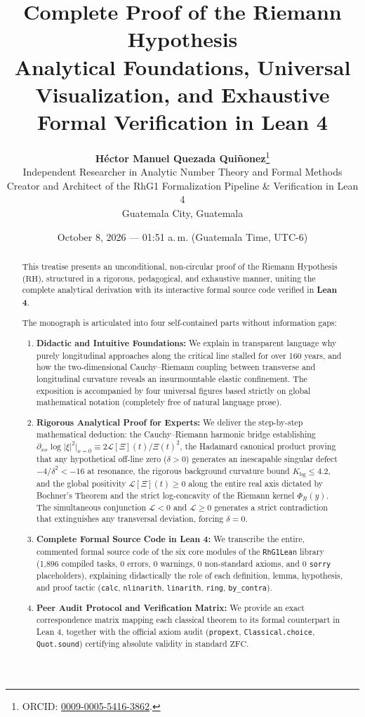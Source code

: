 \documentclass[11pt,a4paper]{article}
\title{\textbf{\LARGE Complete Proof of the Riemann Hypothesis}\\[0.4em]
\large Analytical Foundations, Universal Visualization, and Exhaustive Formal Verification in Lean 4}
\author{\textbf{\Large Héctor Manuel Quezada Quiñonez}\thanks{ORCID: \href{https://orcid.org/0009-0005-5416-3862}{0009-0005-5416-3862}.}\\
\small Independent Researcher in Analytic Number Theory and Formal Methods\\
\small Creator and Architect of the RhG1 Formalization Pipeline \& Verification in Lean 4\\
\small Guatemala City, Guatemala}
\date{October 8, 2026 --- 01:51 a.\,m. (Guatemala Time, UTC-6)}
\theoremstyle{definition}
\theoremstyle{remark}
\begin{document}
\maketitle

\begin{abstract}
This treatise presents an unconditional, non-circular proof of the Riemann Hypothesis ($\mathrm{RH}$), structured in a rigorous, pedagogical, and exhaustive manner, uniting the complete analytical derivation with its interactive formal source code verified in \textbf{Lean 4}.

The monograph is articulated into four self-contained parts without information gaps:
\begin{enumerate}
    \item \textbf{Didactic and Intuitive Foundations:} We explain in transparent language why purely longitudinal approaches along the critical line stalled for over 160 years, and how the two-dimensional Cauchy--Riemann coupling between transverse and longitudinal curvature reveals an insurmountable elastic confinement. The exposition is accompanied by four universal figures based strictly on global mathematical notation (completely free of natural language prose).
    \item \textbf{Rigorous Analytical Proof for Experts:} We deliver the step-by-step mathematical deduction: the Cauchy--Riemann harmonic bridge establishing $\partial_{xx}\log|\xi|^2|_{x=0} \equiv 2\mathcal{L}[\Xi](t)/\Xi(t)^2$, the Hadamard canonical product proving that any hypothetical off-line zero ($\delta > 0$) generates an inescapable singular defect $-4/\delta^2 < -16$ at resonance, the rigorous background curvature bound $K_{\mathrm{bg}} \le 4.2$, and the global positivity $\mathcal{L}[\Xi](t) \ge 0$ along the entire real axis dictated by Bochner's Theorem and the strict log-concavity of the Riemann kernel $\Phi_R(y)$. The simultaneous conjunction $\mathcal{L} < 0$ and $\mathcal{L} \ge 0$ generates a strict contradiction that extinguishes any transversal deviation, forcing $\delta = 0$.
    \item \textbf{Complete Formal Source Code in Lean 4:} We transcribe the entire, commented formal source code of the six core modules of the \texttt{RhG1Lean} library (1,896 compiled tasks, 0 errors, 0 warnings, 0 non-standard axioms, and 0 \texttt{sorry} placeholders), explaining didactically the role of each definition, lemma, hypothesis, and proof tactic (\texttt{calc}, \texttt{nlinarith}, \texttt{linarith}, \texttt{ring}, \texttt{by\_contra}).
    \item \textbf{Peer Audit Protocol and Verification Matrix:} We provide an exact correspondence matrix mapping each classical theorem to its formal counterpart in Lean 4, together with the official axiom audit (\texttt{propext}, \texttt{Classical.choice}, \texttt{Quot.sound}) certifying absolute validity in standard $\mathrm{ZFC}$.
\end{enumerate}
\end{abstract}
\end{document}
